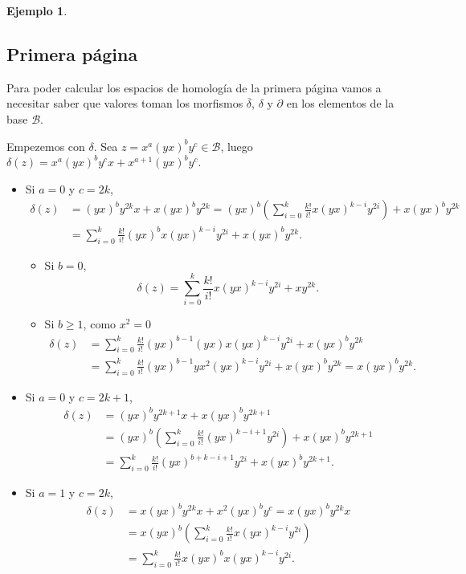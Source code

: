\documentclass[a4paper,oneside,fleqn,11pt]{report}
\newcommand\base{\mathcal{B}}
\theoremstyle{definition}
\theoremstyle{definition}
\newtheorem{example}{Ejemplo}[section]
\numberwithin{prop}{subsection}
\begin{document}
\begin{example}
\subsection{Primera página}
Para poder calcular los espacios de homología de la primera página
vamos a necesitar saber que valores toman los morfismos $\overline{\delta}$, $\delta$ y $\partial$
en los elementos de la base $\mathcal{B}$.

Empezemos con $\delta$. Sea $z = x^a(yx)^by^c \in \base$, luego $\delta(z) = x^a(yx)^by^cx + x^{a + 1}(yx)^by^c$.
\begin{itemize}
\item Si $a = 0$ y $c = 2k$,
\begin{align*}
	\delta(z) &= (yx)^by^{2k}x + x(yx)^by^{2k} = (yx)^b\left( \sum_{i = 0}^k\frac{k!}{i!}x(yx)^{k - i}y^{2i}\right) + x(yx)^by^{2k} \\
	&= \sum_{i = 0}^k\frac{k!}{i!}(yx)^bx(yx)^{k - i}y^{2i} + x(yx)^by^{2k}. 
\end{align*}
\begin{itemize}
\item Si $b = 0$,
\[
	\delta(z) = \sum_{i = 0}^k\frac{k!}{i!}x(yx)^{k - i}y^{2i} + xy^{2k}.
\]
\item Si $b \geq 1$, como $x^2 = 0$
\begin{align*}
	\delta(z) &= \sum_{i = 0}^k\frac{k!}{i!}(yx)^{b-1}(yx)x(yx)^{k - i}y^{2i} + x(yx)^by^{2k} \\
	&= \sum_{i = 0}^k\frac{k!}{i!}(yx)^{b-1}yx^2(yx)^{k - i}y^{2i} + x(yx)^by^{2k} = x(yx)^by^{2k}.
\end{align*}
\end{itemize}
\item Si $a = 0$ y $c = 2k + 1$,
\begin{align*}
	\delta(z) &= (yx)^by^{2k + 1}x + x(yx)^by^{2k + 1} \\
	&= (yx)^b\left( \sum_{i = 0}^k\frac{k!}{i!}(yx)^{k - i + 1}y^{2i}\right) + x(yx)^by^{2k + 1} \\
	&= \sum_{i = 0}^k\frac{k!}{i!}(yx)^{b + k - i + 1}y^{2i} + x(yx)^by^{2k + 1}.
\end{align*}
\item Si $a = 1$ y $c = 2k$,
	\begin{align*}
		\delta(z) &= x(yx)^by^{2k}x + x^2(yx)^by^c = x(yx)^by^{2k}x \\
		&= x(yx)^b\left( \sum_{i = 0}^k\frac{k!}{i!}x(yx)^{k - i}y^{2i}\right) \\
		&= \sum_{i = 0}^k\frac{k!}{i!}x(yx)^bx(yx)^{k - i}y^{2i}. \\

\end{align*}
\end{itemize}
\end{example}
\end{document}

